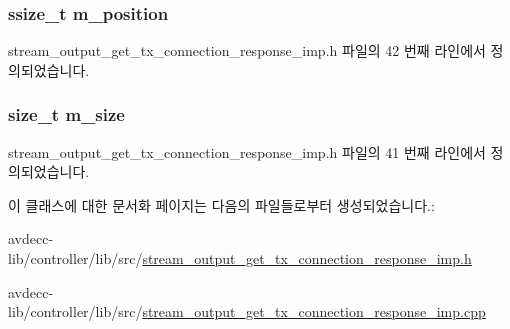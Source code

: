 \subsubsection[{\texorpdfstring{m\+\_\+position}{m_position}}]{\setlength{\rightskip}{0pt plus 5cm}ssize\+\_\+t m\+\_\+position\hspace{0.3cm}{\ttfamily [private]}}\hypertarget{classavdecc__lib_1_1stream__output__get__tx__connection__response__imp_af5e691c4a8a0feb07f48440b321206cd}{}\label{classavdecc__lib_1_1stream__output__get__tx__connection__response__imp_af5e691c4a8a0feb07f48440b321206cd}


stream\+\_\+output\+\_\+get\+\_\+tx\+\_\+connection\+\_\+response\+\_\+imp.\+h 파일의 42 번째 라인에서 정의되었습니다.

\subsubsection[{\texorpdfstring{m\+\_\+size}{m_size}}]{\setlength{\rightskip}{0pt plus 5cm}size\+\_\+t m\+\_\+size\hspace{0.3cm}{\ttfamily [private]}}\hypertarget{classavdecc__lib_1_1stream__output__get__tx__connection__response__imp_a0dc3c363255f193681c77b4d2a82e995}{}\label{classavdecc__lib_1_1stream__output__get__tx__connection__response__imp_a0dc3c363255f193681c77b4d2a82e995}


stream\+\_\+output\+\_\+get\+\_\+tx\+\_\+connection\+\_\+response\+\_\+imp.\+h 파일의 41 번째 라인에서 정의되었습니다.



이 클래스에 대한 문서화 페이지는 다음의 파일들로부터 생성되었습니다.\+:\begin{DoxyCompactItemize}
\item 
avdecc-\/lib/controller/lib/src/\hyperlink{stream__output__get__tx__connection__response__imp_8h}{stream\+\_\+output\+\_\+get\+\_\+tx\+\_\+connection\+\_\+response\+\_\+imp.\+h}\item 
avdecc-\/lib/controller/lib/src/\hyperlink{stream__output__get__tx__connection__response__imp_8cpp}{stream\+\_\+output\+\_\+get\+\_\+tx\+\_\+connection\+\_\+response\+\_\+imp.\+cpp}\end{DoxyCompactItemize}
